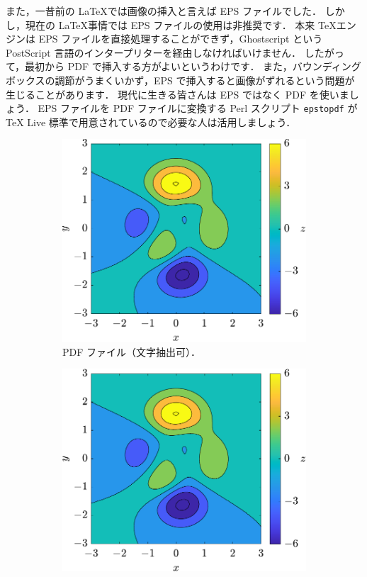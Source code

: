 また，一昔前の \LaTeX では画像の挿入と言えば EPS ファイルでした．
しかし，現在の \LaTeX 事情では EPS ファイルの使用は非推奨です．
本来 \TeX エンジンは EPS ファイルを直接処理することができず，Ghostscript という PostScript 言語のインタープリターを経由しなければいけません．
したがって，最初から PDF で挿入する方がよいというわけです．
また，バウンディングボックスの調節がうまくいかず，EPS で挿入すると画像がずれるという問題が生じることがあります．
現代に生きる皆さんは EPS ではなく PDF を使いましょう．
EPS ファイルを PDF ファイルに変換する Perl スクリプト \verb|epstopdf| が TeX Live 標準で用意されているので必要な人は活用しましょう．

\begin{figure}[tp]
    \centering
    \begin{subfigure}{0.45\columnwidth}
        \centering
        \includegraphics[width=\columnwidth]{figure/comparison1-1.pdf}
        \caption{PDF ファイル（文字抽出可）．}
        \label{subfig:figcomp1_pdf}
    \end{subfigure}
    \hfill %
    \begin{subfigure}{0.45\columnwidth}
        \centering
        \includegraphics[width=\columnwidth]{figure/comparison1-2.pdf}

\end{subfigure}
\end{figure}
